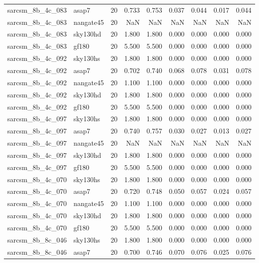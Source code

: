 \begin{tabular}{llrrrrrrr}
sarcsm\_8b\_4c\_083 & asap7 & 20 & 0.733 & 0.753 & 0.037 & 0.044 & 0.017 & 0.044 \\
sarcsm\_8b\_4c\_083 & nangate45 & 20 & NaN & NaN & NaN & NaN & NaN & NaN \\
sarcsm\_8b\_4c\_083 & sky130hd & 20 & 1.800 & 1.800 & 0.000 & 0.000 & 0.000 & 0.000 \\
sarcsm\_8b\_4c\_083 & gf180 & 20 & 5.500 & 5.500 & 0.000 & 0.000 & 0.000 & 0.000 \\
sarcsm\_8b\_4c\_092 & sky130hs & 20 & 1.800 & 1.800 & 0.000 & 0.000 & 0.000 & 0.000 \\
sarcsm\_8b\_4c\_092 & asap7 & 20 & 0.702 & 0.740 & 0.068 & 0.078 & 0.031 & 0.078 \\
sarcsm\_8b\_4c\_092 & nangate45 & 20 & 1.100 & 1.100 & 0.000 & 0.000 & 0.000 & 0.000 \\
sarcsm\_8b\_4c\_092 & sky130hd & 20 & 1.800 & 1.800 & 0.000 & 0.000 & 0.000 & 0.000 \\
sarcsm\_8b\_4c\_092 & gf180 & 20 & 5.500 & 5.500 & 0.000 & 0.000 & 0.000 & 0.000 \\
sarcsm\_8b\_4c\_097 & sky130hs & 20 & 1.800 & 1.800 & 0.000 & 0.000 & 0.000 & 0.000 \\
sarcsm\_8b\_4c\_097 & asap7 & 20 & 0.740 & 0.757 & 0.030 & 0.027 & 0.013 & 0.027 \\
sarcsm\_8b\_4c\_097 & nangate45 & 20 & NaN & NaN & NaN & NaN & NaN & NaN \\
sarcsm\_8b\_4c\_097 & sky130hd & 20 & 1.800 & 1.800 & 0.000 & 0.000 & 0.000 & 0.000 \\
sarcsm\_8b\_4c\_097 & gf180 & 20 & 5.500 & 5.500 & 0.000 & 0.000 & 0.000 & 0.000 \\
sarcsm\_8b\_4c\_070 & sky130hs & 20 & 1.800 & 1.800 & 0.000 & 0.000 & 0.000 & 0.000 \\
sarcsm\_8b\_4c\_070 & asap7 & 20 & 0.720 & 0.748 & 0.050 & 0.057 & 0.024 & 0.057 \\
sarcsm\_8b\_4c\_070 & nangate45 & 20 & 1.100 & 1.100 & 0.000 & 0.000 & 0.000 & 0.000 \\
sarcsm\_8b\_4c\_070 & sky130hd & 20 & 1.800 & 1.800 & 0.000 & 0.000 & 0.000 & 0.000 \\
sarcsm\_8b\_4c\_070 & gf180 & 20 & 5.500 & 5.500 & 0.000 & 0.000 & 0.000 & 0.000 \\
sarcsm\_8b\_8c\_046 & sky130hs & 20 & 1.800 & 1.800 & 0.000 & 0.000 & 0.000 & 0.000 \\
sarcsm\_8b\_8c\_046 & asap7 & 20 & 0.700 & 0.746 & 0.070 & 0.076 & 0.025 & 0.076 \\

\end{tabular}
